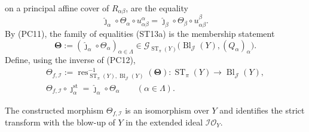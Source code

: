 \begin{definition}
  on a principal affine cover of $R_{\alpha\beta}$, are the equality
  \[
    \widehat\jmath_\alpha\circ\Theta_\alpha\circ
      u_{\alpha\beta}^\alpha
      =\widehat\jmath_\beta\circ\Theta_\beta\circ
        u_{\alpha\beta}^\beta.                                  \tag{ST13a}
  \]
  By (PC11), the family of equalities (ST13a) is the membership statement
  \[
    \mathbf\Theta:=
      (\widehat\jmath_\alpha\circ\Theta_\alpha)_{\alpha\in\Lambda}
      \in\mathscr G_{\operatorname{ST}_\pi(Y)}
        \bigl(\operatorname{Bl}_{\mathcal J}(Y),(Q_\alpha)_\alpha\bigr).
                                                                    \tag{ST14}
  \]
  Define, using the inverse of (PC12),
  \[
  \begin{gathered}
    \Theta_{f,\mathcal I}:=
      \operatorname{res}_{\operatorname{ST}_\pi(Y),
        \operatorname{Bl}_{\mathcal J}(Y)}^{-1}(\mathbf\Theta)
      \colon\operatorname{ST}_\pi(Y)\longrightarrow
        \operatorname{Bl}_{\mathcal J}(Y),\\
    \Theta_{f,\mathcal I}\circ\jmath_\alpha^{\mathrm{st}}
      =\widehat\jmath_\alpha\circ\Theta_\alpha
      \qquad(\alpha\in\Lambda).                                
  \end{gathered} \tag{ST15}
  \]
\end{definition}

\begin{theorem}
  \label{thm:nagata-strict-transform-is-blowup}

  The constructed morphism $\Theta_{f,\mathcal I}$ is an isomorphism over
  $Y$ and identifies the strict transform with the blow-up of $Y$ in the
  extended ideal $\mathcal I\mathcal O_Y$.
\end{theorem}

